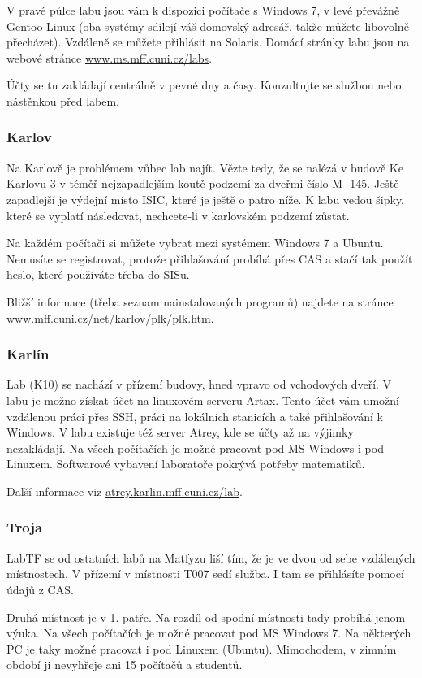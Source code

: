 V pravé půlce labu jsou vám k dispozici počítače s Windows 7, v levé převážně
Gentoo Linux (oba systémy sdílejí váš domovský adresář, takže můžete libovolně
přecházet). Vzdáleně se můžete přihlásit na Solaris. Domácí stránky labu jsou na
webové stránce \url{www.ms.mff.cuni.cz/labs}.

Účty se tu zakládají centrálně v pevné dny a časy. Konzultujte se službou nebo
nástěnkou před labem.


\subsubsection{Karlov}
Na Karlově je problémem vůbec lab najít. Vězte tedy, že se nalézá v budově Ke
Karlovu 3 v téměř nejzapadlejším koutě podzemí za dveřmi číslo M -145. Ještě
zapadlejší je výdejní místo ISIC, které je ještě o patro níže. K labu vedou
šipky, které se vyplatí následovat, nechcete-li v karlovském podzemí zůstat.

Na každém počítači si můžete vybrat mezi systémem Windows 7 a Ubuntu. Nemusíte
se registrovat, protože přihlašování probíhá přes CAS a stačí tak použít heslo,
které používáte třeba do SISu.

Bližší informace (třeba seznam nainstalovaných programů) najdete na stránce
\url{www.mff.cuni.cz/net/karlov/plk/plk.htm}.


\subsubsection{Karlín}
Lab (K10) se nachází v přízemí budovy, hned vpravo od vchodových dveří. V labu
je možno získat účet na linuxovém serveru Artax. Tento účet vám umožní vzdálenou
práci přes SSH, práci na lokálních stanicích a také přihlašování k Windows. V
labu existuje též server Atrey, kde se účty až na výjimky nezakládají. Na všech
počítačích je možné pracovat pod MS Windows i pod Linuxem. Softwarové vybavení
laboratoře pokrývá potřeby matematiků.

Další informace viz \url{atrey.karlin.mff.cuni.cz/lab}.


\subsubsection{Troja}
LabTF se od ostatních labů na Matfyzu liší tím, že je ve dvou od sebe vzdálených
místnostech. V přízemí v místnosti T007 sedí služba. I tam se přihlásíte pomocí
údajů z CAS.

Druhá místnost je v 1. patře. Na rozdíl od spodní místnosti tady probíhá jenom
výuka. Na všech počítačích je možné pracovat pod MS Windows 7. Na některých PC
je taky možné pracovat i pod Linuxem (Ubuntu). Mimochodem, v zimním období ji
nevyhřeje ani 15 počítačů a studentů.


